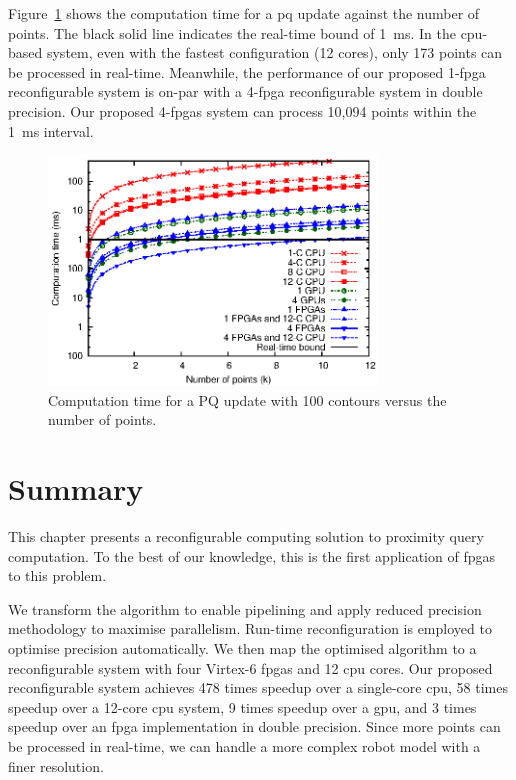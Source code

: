 Figure~\ref{fig:scalability} shows the computation time for a \gls{pq} update against the number of points.
The black solid line indicates the real-time bound of 1~ms.
In the \gls{cpu}-based system, even with the fastest configuration (12 cores), only 173 points can be processed in real-time.
Meanwhile, the performance of our proposed 1-\gls{fpga} reconfigurable system is on-par with a 4-\gls{fpga} reconfigurable system in double precision.
Our proposed 4-\gls{fpga}s system can process 10,094 points within the 1~ms interval.

\begin{figure}[ht]
\begin{center}
\includegraphics[width=0.78\textwidth]{3_precision/figures/fig_scalability}
\end{center}
\caption{Computation time for a PQ update with 100 contours versus the number of points.}
\label{fig:scalability}
\end{figure}

\section{Summary}
\label{sec:precision_summary}

This chapter presents a reconfigurable computing solution to proximity query computation.
To the best of our knowledge, this is the first application of \glspl{fpga} to this problem.

We transform the algorithm to enable pipelining and apply reduced precision methodology to maximise parallelism.
Run-time reconfiguration is employed to optimise precision automatically.
We then map the optimised algorithm to a reconfigurable system with four Virtex-6 \gls{fpga}s and 12 \gls{cpu} cores.
Our proposed reconfigurable system achieves 478 times speedup over a single-core \gls{cpu}, 58 times speedup over a 12-core \gls{cpu} system, 9 times speedup over a \gls{gpu},
and 3 times speedup over an \gls{fpga} implementation in double precision.
Since more points can be processed in real-time, we can handle a more complex robot model with a finer resolution.
